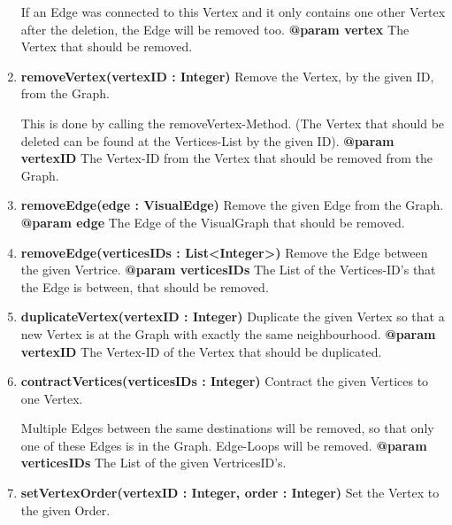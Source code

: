 \documentclass{article}
\begin{document}
\begin{enumerate}[+]
{						If an Edge was connected to this Vertex and it only contains one other Vertex after the deletion, the Edge will be removed too.
						\newline
						\textbf{@param vertex}
							The Vertex that should be removed.
							\newline
					}
					\item{
						\textbf{removeVertex(vertexID : Integer)} \newline
						Remove the Vertex, by the given ID, from the Graph.
						
						This is done by calling the removeVertex-Method.
						(The Vertex that should be deleted can be found at the Vertices-List by the given ID).
						\newline
						\textbf{@param vertexID}
							The Vertex-ID from the Vertex that should be removed from the Graph.
							\newline
					}
					\item{
						\textbf{removeEdge(edge : VisualEdge)} \newline
						Remove the given Edge from the Graph.
						\newline
						\textbf{@param edge}
							The Edge of the VisualGraph that should be removed.
							\newline
					}
					\item{
						\textbf{removeEdge(verticesIDs : List<Integer>)} \newline
						Remove the Edge between the given Vertrice.
						\newline
						\textbf{@param verticesIDs}
							The List of the Vertices-ID's that the Edge is between, that should be removed.
							\newline
					}
					\item{
						\textbf{duplicateVertex(vertexID : Integer)} \newline
						Duplicate the given Vertex so that a new Vertex is at the Graph with exactly the same neighbourhood.
						\newline
						\textbf{@param vertexID}
							The Vertex-ID of the Vertex that should be duplicated.
							\newline
					}
					\item{
						\textbf{contractVertices(verticesIDs : Integer)} \newline
						Contract the given Vertices to one Vertex.
						
						Multiple Edges between the same destinations will be removed, so that only one of these Edges is in the Graph.
						Edge-Loops will be removed.
						\newline
						\textbf{@param verticesIDs}
							The List of the given VertricesID's.
							\newline
					}
					\item{
						\textbf{setVertexOrder(vertexID : Integer, order : Integer)} \newline
						Set the Vertex to the given Order.
						
}
\end{enumerate}
\end{document}
